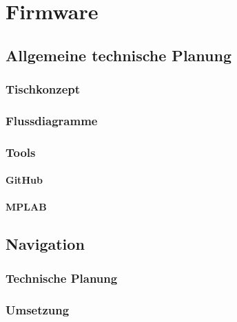 \chapter{Firmware}
\renewcommand{\kapitelautor}{Autor: Christina Bornberg, Lucas Ullrich}

\section{Allgemeine technische Planung}

  \subsection{Tischkonzept}

  \subsection{Flussdiagramme}

  \subsection{Tools}

    \subsubsection{GitHub}

    \subsubsection{MPLAB}

\section{Navigation}

  \subsection{Technische Planung}

  \subsection{Umsetzung}

